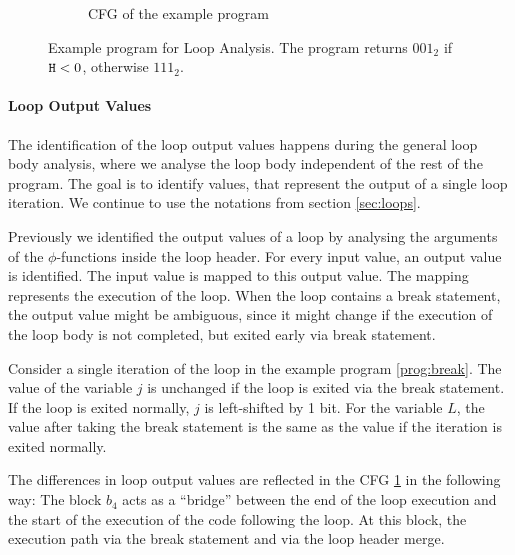\begin{figure}
\begin{subfigure}{.4\textwidth}
    \caption{CFG of the example program}\label{fig:breakcfg}
\end{subfigure}
\caption{Example program for Loop Analysis. The program returns $001_2$ if $\mathtt{H} < 0$, otherwise $111_2$.}\label{fig:break}
\end{figure}

\paragraph{Loop Output Values}
The identification of the loop output values happens during the general loop body analysis, where we analyse the loop body independent of the rest of the program. The goal is to identify values, that represent the output of a single loop iteration. We continue to use the notations from section \ref{sec:loops}.

Previously we identified the output values of a loop by analysing the arguments of the $\phi$-functions inside the loop header. For every input value, an output value is identified. The input value is mapped to this output value. The mapping represents the execution of the loop. When the loop contains a break statement, the output value might be ambiguous, since it might change if the execution of the loop body is not completed, but exited early via break statement.

Consider a single iteration of the loop in the example program \ref{prog:break}. The value of the variable $j$ is unchanged if the loop is exited via the break statement. If the loop is exited normally, $j$ is left-shifted by 1 bit. For the variable $L$, the value after taking the break statement is the same as the value if the iteration is exited normally.

The differences in loop output values are reflected in the CFG \ref{fig:breakcfg} in the following way: The block $b_4$ acts as a \enquote{bridge} between the end of the loop execution and the start of the execution of the code following the loop. At this block, the execution path via the break statement and via the loop header merge.


